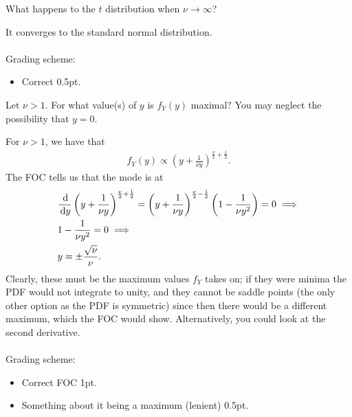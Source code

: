 \begin{exercise}[0.5]
What happens to the $t$ distribution when $\nu\rightarrow\infty$?
\begin{solution}
It converges to the standard normal distribution.
\\\\
Grading scheme:
\begin{itemize}
    \item Correct 0.5pt.
\end{itemize}
\end{solution}
\end{exercise}

\begin{exercise}[1.5]
Let $\nu>1$. For what value(s) of $y$ is $f_Y(y)$ maximal? You may neglect the possibility that $y=0$.
\begin{solution}
For $\nu>1$, we have that
\begin{align*}
    f_Y(y)\propto \left(y+\frac{1}{\nu y}\right)^{\frac{\nu}{2}+\frac12}.
\end{align*}
The FOC tells us that the mode is at
\begin{align*}
    &\frac{\d}{\d y} \left(y+\frac{1}{\nu y}\right)^{\frac{\nu}{2}+\frac12} = \left(y+\frac{1}{\nu y}\right)^{\frac{\nu}{2}-\frac12}\left(1-\frac{1}{\nu y^2}\right) = 0\implies\\
    &1-\frac{1}{\nu y^2} = 0\implies\\
    &y=\pm\frac{\sqrt{\nu}}{\nu}.
\end{align*}
Clearly, these must be the maximum values $f_Y$ takes on; if they were minima the PDF would not integrate to unity, and they cannot be saddle points (the only other option as the PDF is symmetric) since then there would be a different maximum, which the FOC would show. Alternatively, you could look at the second derivative.
\\\\
Grading scheme:
\begin{itemize}
    \item Correct FOC 1pt.
    \item Something about it being a maximum (lenient) 0.5pt.
\end{itemize}
\end{solution}
\end{exercise}
